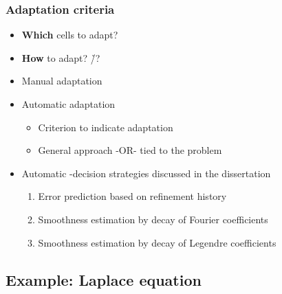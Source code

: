 \begin{frame}
\frametitle{Adaptation criteria}

\begin{itemize}
\item \textbf{Which} cells to adapt?
\item \textbf{How} to adapt? \h/\p?
\end{itemize}

\pause
\vfill{}

\begin{itemize}
\item Manual adaptation
\item Automatic adaptation
  \begin{itemize}
  \item Criterion to indicate adaptation
  \item General approach -OR- tied to the problem
  \end{itemize}
\end{itemize}

\pause
\vfill{}

\begin{itemize}
\item Automatic \hp-decision strategies discussed in the dissertation
  \begin{enumerate}
  \item Error prediction based on refinement history \newline \parencite{melenk2001}
  \item Smoothness estimation by decay of Fourier coefficients \newline \parencite{bangerth2009}
  \item Smoothness estimation by decay of Legendre coefficients \newline \parencite{mavriplis1994}
  \end{enumerate}
\end{itemize}
\end{frame}





\subsection{Example: Laplace equation}





